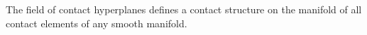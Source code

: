 The field of contact hyperplanes defines a contact structure on the manifold of all contact elements of any smooth manifold.
